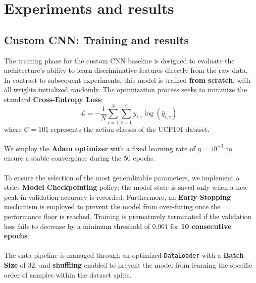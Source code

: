 \section{Experiments and results}


\subsection{Custom CNN: Training and results}


The training phase for the custom CNN baseline is designed to evaluate the architecture's ability to learn discriminative features directly from the raw data. In contrast to subsequent experiments, this model is trained \textbf{from scratch}, with all weights initialized randomly. The optimization process seeks to minimize the standard \textbf{Cross-Entropy Loss}: $$\mathcal{L} = -\frac{1}{N} \sum_{i=1}^{N} \sum_{c=1}^{C} y_{i,c} \log(\hat{y}_{i,c})$$
where $C=101$ represents the action classes of the UCF101 dataset.\\\\
We employ the \textbf{Adam optimizer} with a fixed learning rate of $\eta = 10^{-3}$ to ensure a stable convergence during the 50 epochs.\\\\
To ensure the selection of the most generalizable parameters, we implement a strict \textbf{Model Checkpointing} policy: the model state is saved only when a new peak in validation accuracy is recorded. Furthermore, an \textbf{Early Stopping} mechanism is employed to prevent the model from over-fitting once the performance floor is reached. Training is prematurely terminated if the validation loss fails to decrease by a minimum threshold of $0.001$ for \textbf{10 consecutive epochs}.\\\\
The data pipeline is managed through an optimized \texttt{DataLoader} with a \textbf{Batch Size} of 32, and \textbf{shuffling} enabled to prevent the model from learning the specific order of samples within the dataset splits.


